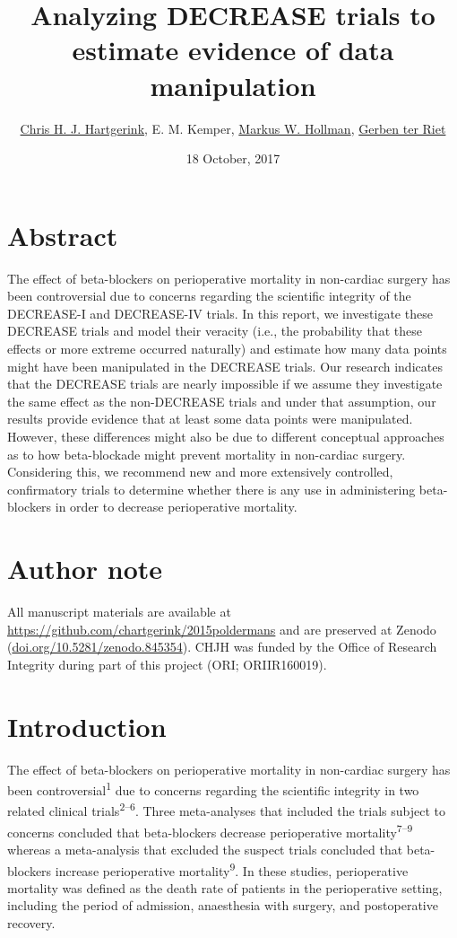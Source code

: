 \documentclass[]{article}
\title{Analyzing DECREASE trials to estimate evidence of data manipulation}
\author{\href{https://orcid.org/0000-0003-1050-6809}{Chris H. J. Hartgerink}, E.
M. Kemper, \href{https://orcid.org/0000-0001-8248-0244}{Markus W.
Hollman}, \href{https://orcid.org/0000-0002-2231-7637}{Gerben ter Riet}}
\date{18 October, 2017}
\begin{document}
\maketitle

\section{Abstract}\label{abstract}

The effect of beta-blockers on perioperative mortality in non-cardiac
surgery has been controversial due to concerns regarding the scientific
integrity of the DECREASE-I and DECREASE-IV trials. In this report, we
investigate these DECREASE trials and model their veracity (i.e., the
probability that these effects or more extreme occurred naturally) and
estimate how many data points might have been manipulated in the
DECREASE trials. Our research indicates that the DECREASE trials are
nearly impossible if we assume they investigate the same effect as the
non-DECREASE trials and under that assumption, our results provide
evidence that at least some data points were manipulated. However, these
differences might also be due to different conceptual approaches as to
how beta-blockade might prevent mortality in non-cardiac surgery.
Considering this, we recommend new and more extensively controlled,
confirmatory trials to determine whether there is any use in
administering beta-blockers in order to decrease perioperative
mortality.

\section{Author note}\label{author-note}

All manuscript materials are available at
\url{https://github.com/chartgerink/2015poldermans} and are preserved at
Zenodo
(\href{https://doi.org/10.5281/zenodo.845354}{doi.org/10.5281/zenodo.845354}).
CHJH was funded by the Office of Research Integrity during part of this
project (ORI; ORIIR160019).

\section{Introduction}\label{introduction}

The effect of beta-blockers on perioperative mortality in non-cardiac
surgery has been controversial\textsuperscript{1} due to concerns
regarding the scientific integrity in two related clinical
trials\textsuperscript{2--6}. Three meta-analyses that included the
trials subject to concerns concluded that beta-blockers decrease
perioperative mortality\textsuperscript{7--9} whereas a meta-analysis
that excluded the suspect trials concluded that beta-blockers increase
perioperative mortality\textsuperscript{9}. In these studies,
perioperative mortality was defined as the death rate of patients in the
perioperative setting, including the period of admission, anaesthesia
with surgery, and postoperative recovery.
\end{document}
